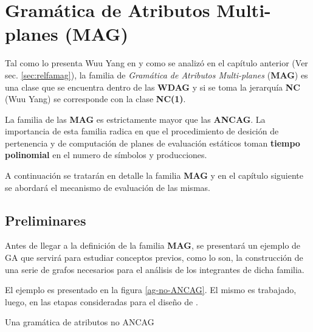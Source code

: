 \chapter{Gramática de Atributos Multi-planes (MAG)}
\label{chap:mag}
\minitoc

Tal como lo presenta Wuu Yang en \cite{wuu-yang1} y como se analizó en el capítulo anterior (Ver sec. \ref{sec:relfamag}), la familia de \textit{Gramática de Atributos Multi-planes} (\textbf{MAG}) es una clase que se encuentra dentro de las \textbf{WDAG} y si se toma la jerarquía \textbf{NC} (Wuu Yang) se corresponde con la clase \textbf{NC(1)}.

La familia de las \textbf{MAG} es estrictamente mayor que las \textbf{ANCAG}. La importancia de esta familia radica en que el procedimiento de desición de pertenencia y de computación de planes de evaluación estáticos toman \textbf{tiempo polinomial} en el numero de símbolos y producciones.

A continuación se tratarán en detalle la familia \textbf{MAG} y en el capítulo siguiente se abordará el mecanismo de evaluación de las mismas.

\section{Preliminares}
\label{sec:pre-grafos}

Antes de llegar a la definición de la familia \textbf{MAG}, se presentará un ejemplo de GA que servirá para estudiar conceptos previos, como lo son, la construcción de una serie de grafos necesarios para el análisis de los integrantes de dicha familia.

El ejemplo es presentado en la figura \ref{ag-no-ANCAG}. El mismo es trabajado, luego, en las etapas consideradas para el diseño de \maggen.

\begin{AG}
    \begin{Attribution}
    \end{Attribution}
    \begin{Attribution}
    \end{Attribution}
    \begin{Attribution}
    \end{Attribution}
    \begin{Attribution}
    \end{Attribution}
    \begin{Attribution}
    \end{Attribution}
\label{ag-no-ANCAG}
\caption{Una gramática de atributos no ANCAG}
\end{AG}

